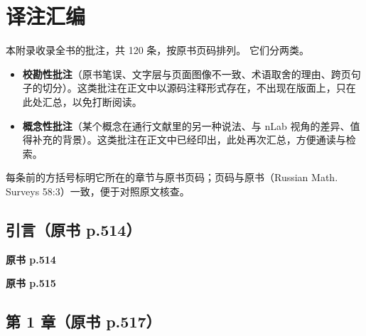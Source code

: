 \chapter{译注汇编}
\label{app:notes}

本附录收录全书的批注，共 120 条，按原书页码排列。
它们分两类。

\begin{itemize}[leftmargin=2.6em,itemsep=1pt,topsep=2pt]
  \item \textbf{校勘性批注}（原书笔误、文字层与页面图像不一致、术语取舍的理由、跨页句子的切分）。这类批注在正文中以源码注释形式存在，不出现在版面上，只在此处汇总，以免打断阅读。
  \item \textbf{概念性批注}（某个概念在通行文献里的另一种说法、与 nLab 视角的差异、值得补充的背景）。这类批注在正文中已经印出，此处再次汇总，方便通读与检索。
\end{itemize}

每条前的方括号标明它所在的章节与原书页码；页码与原书（Russian Math.
Surveys 58:3）一致，便于对照原文核查。

\section*{引言（原书 p.514）}

\medskip\noindent\textbf{原书 p.514}\par
{}\par\smallskip
\medskip\noindent\textbf{原书 p.515}\par
{}\par\smallskip

\section*{第 1 章（原书 p.517）}


